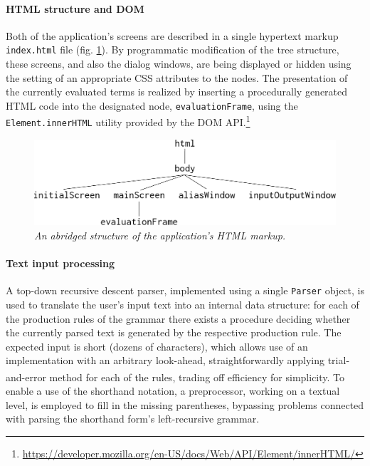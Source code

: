 \documentclass[table, a4paper, 10pt]{book}
\newcommand{\cit}[1]{\textsuperscript{\cite{#1}}}
\begin{document}
\paragraph{HTML structure and DOM}
Both of the application's screens are described in a single hypertext markup \texttt{index.html} file (fig. \ref{html}).
By programmatic modification of the tree structure,
these screens, and also the dialog windows, are being
displayed or hidden using the setting of an appropriate CSS attributes to
the nodes. The presentation of the currently evaluated terms is realized
by inserting a procedurally generated HTML code into
the designated node, \texttt{evaluationFrame}, using the \texttt{Element.innerHTML} utility provided by the
DOM API.\footnote{\url{https://developer.mozilla.org/en-US/docs/Web/API/Element/innerHTML/}}

\begin{figure}[H]\centering
\includegraphics[scale=0.35]{htmlstructure.pdf}
\caption{\textit{An abridged structure of the application's HTML markup.}}\label{html}
\end{figure}

\paragraph{Text input processing}
A top-down recursive descent parser, implemented using a single \texttt{Parser} object,
is used to translate the user's input text into an
internal data structure: for each of the production rules of the grammar there exists
a procedure deciding whether the currently parsed text is generated by the respective production rule.
The expected input is short (dozens of characters), which allows use of an implementation with an arbitrary
look-ahead, straightforwardly applying trial-and-error method for each of the rules,
trading off efficiency for simplicity.\cit{compilers} To enable a use of
the shorthand notation, a preprocessor, working on a textual level, is
employed to fill in the missing parentheses, bypassing problems connected
with parsing the shorthand form's left-recursive grammar.
\end{document}
